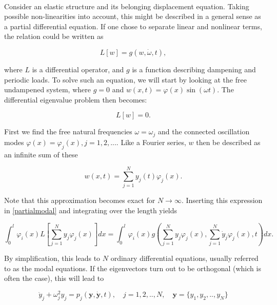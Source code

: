 \\

Consider an elastic structure and its belonging displacement equation. Taking possible non-linearities into account, this might be described in a general sense as a partial differential equation. If one chose to separate linear and nonlinear terms, the relation could be written as

\begin{equation}
L[w]=g(w, \dot{\omega}, t),
\label{partialmodal}
\end{equation}

where $L$ is a differential operator, and $g$ is a function describing dampening and periodic loads. To solve such an equation, we will start by looking at the free undampened system, where $g=0$ and $w(x, t)=\varphi(x) \sin (\omega t)$. The differential eigenvalue problem then becomes:

\begin{equation}
L[w]=0.
\end{equation}

First we find the free natural frequencies $\omega=\omega_j$ and the connected oscillation modes $\varphi(x)=\varphi_j(x), j=1,2,...$. Like a Fourier series, $w$ then be described as an infinite sum of these

\begin{equation}
w(x, t)=\sum_{j=1}^N y_j(t) \varphi_j(x).
\label{modalsolution}
\end{equation}

Note that this approximation becomes exact for $N \rightarrow \infty$. Inserting this expression in \ref{partialmodal} and integrating over the length yields

\begin{equation}
\int_0^l \varphi_i(x) L\left[\sum_{j=1}^N y_j \varphi_j(x) \right] d x=\int_0^l \varphi_i(x) g\left(\sum_{j=1}^N y_j \varphi_j(x), \sum_{j=1}^N \dot{y}_j \varphi_j(x), t\right) d x .
\end{equation}

By simplification, this leads to $N$ ordinary differential equations, usually referred to as the modal equations. If the eigenvectors turn out to be orthogonal (which is often the case), this will lead to

\begin{equation}
\ddot{y}_j+\omega_j^2 y_j=p_j(\mathbf{y}, \dot{\mathbf{y}}, t), \quad j=1,2,..,N, \quad \mathbf{y}=\{y_1,y_2,..,y_N \}
\end{equation}

